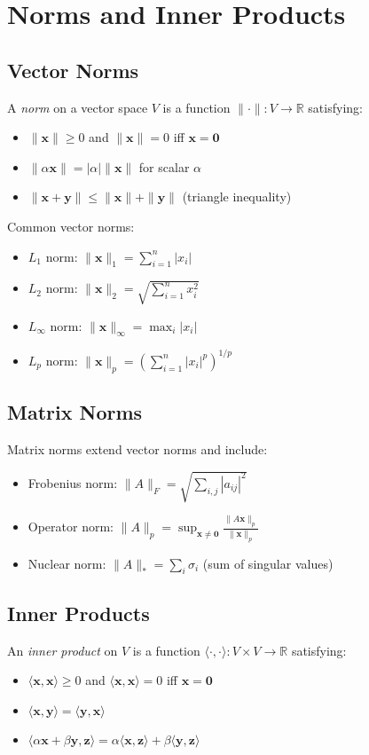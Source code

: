 \section{Norms and Inner Products}
\subsection{Vector Norms}
A \emph{norm} on a vector space $V$ is a function $\|\cdot\|: V \to \mathbb{R}$ satisfying:
\begin{itemize}
    \item $\|\mathbf{x}\| \ge 0$ and $\|\mathbf{x}\| = 0$ iff $\mathbf{x} = \mathbf{0}$
    \item $\|\alpha \mathbf{x}\| = |\alpha| \|\mathbf{x}\|$ for scalar $\alpha$
    \item $\|\mathbf{x} + \mathbf{y}\| \le \|\mathbf{x}\| + \|\mathbf{y}\|$ (triangle inequality)
\end{itemize}

Common vector norms:
\begin{itemize}
    \item $L_1$ norm: $\|\mathbf{x}\|_1 = \sum_{i=1}^n |x_i|$
    \item $L_2$ norm: $\|\mathbf{x}\|_2 = \sqrt{\sum_{i=1}^n x_i^2}$
    \item $L_\infty$ norm: $\|\mathbf{x}\|_\infty = \max_i |x_i|$
    \item $L_p$ norm: $\|\mathbf{x}\|_p = \left(\sum_{i=1}^n |x_i|^p\right)^{1/p}$
\end{itemize}

\subsection{Matrix Norms}
Matrix norms extend vector norms and include:
\begin{itemize}
    \item Frobenius norm: $\|A\|_F = \sqrt{\sum_{i,j} |a_{ij}|^2}$
    \item Operator norm: $\|A\|_p = \sup_{\mathbf{x} \neq \mathbf{0}} \frac{\|A\mathbf{x}\|_p}{\|\mathbf{x}\|_p}$
    \item Nuclear norm: $\|A\|_* = \sum_i \sigma_i$ (sum of singular values)
\end{itemize}

\subsection{Inner Products}
An \emph{inner product} on $V$ is a function $\langle \cdot, \cdot \rangle: V \times V \to \mathbb{R}$ satisfying:
\begin{itemize}
    \item $\langle \mathbf{x}, \mathbf{x} \rangle \ge 0$ and $\langle \mathbf{x}, \mathbf{x} \rangle = 0$ iff $\mathbf{x} = \mathbf{0}$
    \item $\langle \mathbf{x}, \mathbf{y} \rangle = \langle \mathbf{y}, \mathbf{x} \rangle$
    \item $\langle \alpha \mathbf{x} + \beta \mathbf{y}, \mathbf{z} \rangle = \alpha \langle \mathbf{x}, \mathbf{z} \rangle + \beta \langle \mathbf{y}, \mathbf{z} \rangle$
\end{itemize}

